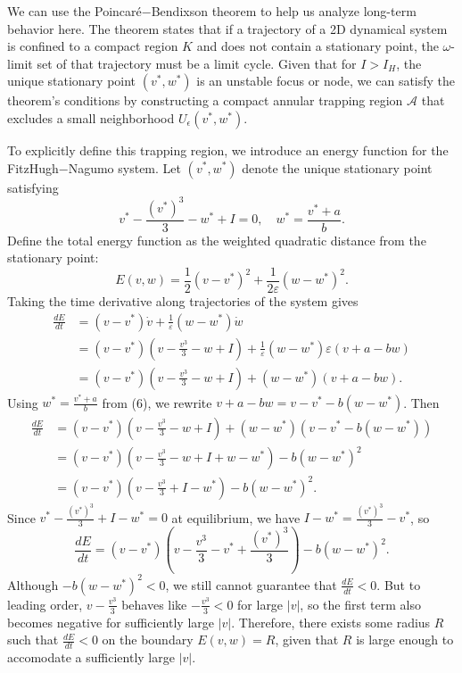 \documentclass{article}
\begin{document}
We can use the Poincaré$-$Bendixson theorem to help us analyze long-term behavior here. 
The theorem states that if a trajectory of a 2D dynamical system is confined to a compact region $K$ and does not contain 
a stationary point, the $\omega$-limit set of that trajectory must be a limit cycle. Given that for $I > I_H$, the unique 
stationary point $(v^*, w^*)$ is an unstable focus or node, we can satisfy the theorem's conditions by constructing a 
compact annular trapping region $\mathcal{A}$ that excludes a small neighborhood $U_\epsilon(v^*, w^*)$. 

To explicitly define this trapping region, we introduce an energy function for the FitzHugh$-$Nagumo system. 
Let $(v^*, w^*)$ denote the unique stationary point satisfying 
\begin{equation}
v^* - \frac{(v^*)^3}{3} - w^* + I = 0, \quad w^* = \frac{v^* + a}{b}.
\end{equation}
Define the total energy function as the weighted quadratic distance from the stationary point:
\begin{equation}
E(v, w) = \frac{1}{2}(v - v^*)^2 + \frac{1}{2\varepsilon}(w - w^*)^2.
\end{equation}
Taking the time derivative along trajectories of the system gives
\begin{align}
\frac{dE}{dt} &= (v - v^*)\dot{v} + \frac{1}{\varepsilon}(w - w^*)\dot{w} \\
             &= (v - v^*)\left(v - \frac{v^3}{3} - w + I\right) + \frac{1}{\varepsilon}(w - w^*)\varepsilon(v + a - bw) \\
             &= (v - v^*)\left(v - \frac{v^3}{3} - w + I\right) + (w - w^*)(v + a - bw).
\end{align}
Using $w^* = \frac{v^* + a}{b}$ from (6), we rewrite $v + a - bw = v - v^* - b(w - w^*)$. Then
\begin{align}
\frac{dE}{dt} &= (v - v^*)\left(v - \frac{v^3}{3} - w + I\right) + (w - w^*)\left(v - v^* - b(w - w^*)\right) \\
             &= (v - v^*)\left(v - \frac{v^3}{3} - w + I + w - w^*\right) - b(w - w^*)^2 \\
             &= (v - v^*)\left(v - \frac{v^3}{3} + I - w^*\right) - b(w - w^*)^2.
\end{align}
Since $v^* - \frac{(v^*)^3}{3} + I - w^* = 0$ at equilibrium, we have $I - w^* = \frac{(v^*)^3}{3} - v^*$, so
\begin{equation}
\frac{dE}{dt} = (v - v^*)\left(v - \frac{v^3}{3} - v^* + \frac{(v^*)^3}{3}\right) - b(w - w^*)^2.
\end{equation}
Although $-b(w - w^*)^2 < 0$, we still cannot guarantee that $\frac{dE}{dt} < 0$. But to leading 
order, $v-\frac{v^3}{3}$ behaves like $-\frac{v^3}{3}<0$ for large $|v|$, so the first term also becomes negative for 
sufficiently large $|v|$. Therefore, there exists some radius $R$ such that $\frac{dE}{dt} < 0$ on the boundary 
$E(v, w) = R$, given that $R$ is large enough to accomodate a sufficiently large $|v|$.
\end{document}
